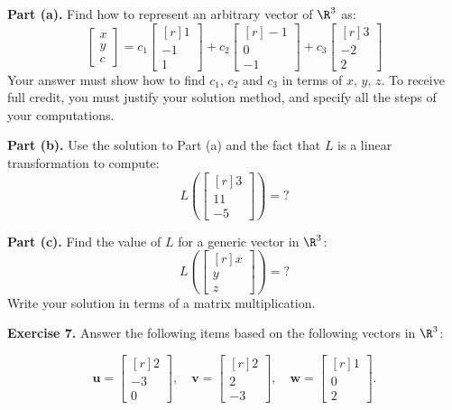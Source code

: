 \documentclass[12pt]{article}
\begin{document}
\textbf{Part (a).} Find how to represent an arbitrary vector of $\R^3$ as:
\[
\begin{bmatrix}x\\y\\c\end{bmatrix}=
c_1\begin{bmatrix*}[r] 1\\ -1\\ 1\end{bmatrix*}+
c_2\begin{bmatrix*}[r] -1\\ 0\\-1\end{bmatrix*}+
c_3\begin{bmatrix*}[r] 3\\ -2\\ 2\end{bmatrix*}
\]
Your answer must show how to find $c_1$, $c_2$ and $c_3$ in terms of $x$, $y$, $z$. To receive full credit, you must justify your solution method, and specify all the steps of your computations.

\textbf{Part (b).} Use the solution to Part (a) and the fact that $L$ is a linear transformation to compute:
\[
L\left(\begin{bmatrix*}[r] 3 \\ 11 \\ -5\end{bmatrix*}\right)=? 
\]

\textbf{Part (c).} Find the value of $L$ for a generic vector in $\R^3$:
\[
L\left(\begin{bmatrix*}[r] x \\ y \\ z\end{bmatrix*}\right)=?
\]
Write your solution in terms of a matrix multiplication.

\textbf{Exercise 7.} Answer the following items based on the following vectors in $\R^3$:

\[
\mathbf{u}=\begin{bmatrix*}[r] 2\\ -3\\ 0\end{bmatrix*},\quad
\mathbf{v}=\begin{bmatrix*}[r] 2\\ 2\\ -3\end{bmatrix*},\quad
\mathbf{w}=\begin{bmatrix*}[r] 1\\ 0\\  2\end{bmatrix*}.
\]
\end{document}

